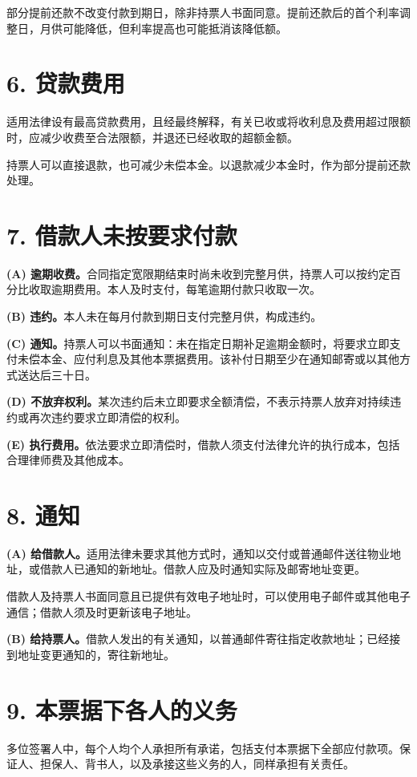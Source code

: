 \documentclass[UTF8,fontset=none,11pt,a4paper]{ctexart}
\begin{document}
部分提前还款不改变付款到期日，除非持票人书面同意。提前还款后的首个利率调整日，月供可能降低，但利率提高也可能抵消该降低额。


\section*{6. 贷款费用}
适用法律设有最高贷款费用，且经最终解释，有关已收或将收利息及费用超过限额时，应减少收费至合法限额，并退还已经收取的超额金额。


持票人可以直接退款，也可减少未偿本金。以退款减少本金时，作为部分提前还款处理。


\section*{7. 借款人未按要求付款}
\textbf{(A) 逾期收费。}合同指定宽限期结束时尚未收到完整月供，持票人可以按约定百分比收取逾期费用。本人及时支付，每笔逾期付款只收取一次。


\textbf{(B) 违约。}本人未在每月付款到期日支付完整月供，构成违约。


\textbf{(C) 通知。}持票人可以书面通知：未在指定日期补足逾期金额时，将要求立即支付未偿本金、应付利息及其他本票据费用。该补付日期至少在通知邮寄或以其他方式送达后三十日。


\textbf{(D) 不放弃权利。}某次违约后未立即要求全额清偿，不表示持票人放弃对持续违约或再次违约要求立即清偿的权利。


\textbf{(E) 执行费用。}依法要求立即清偿时，借款人须支付法律允许的执行成本，包括合理律师费及其他成本。


\section*{8. 通知}
\textbf{(A) 给借款人。}适用法律未要求其他方式时，通知以交付或普通邮件送往物业地址，或借款人已通知的新地址。借款人应及时通知实际及邮寄地址变更。


借款人及持票人书面同意且已提供有效电子地址时，可以使用电子邮件或其他电子通信；借款人须及时更新该电子地址。


\textbf{(B) 给持票人。}借款人发出的有关通知，以普通邮件寄往指定收款地址；已经接到地址变更通知的，寄往新地址。


\section*{9. 本票据下各人的义务}
多位签署人中，每个人均个人承担所有承诺，包括支付本票据下全部应付款项。保证人、担保人、背书人，以及承接这些义务的人，同样承担有关责任。
\end{document}
